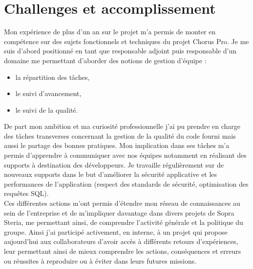 \documentclass[12pt,a4paper]{article}
\begin{document}
\section{Challenges et accomplissement}
Mon expérience de plus d'un an sur le projet m'a permis de monter en compétence sur des sujets fonctionnels et techniques du projet Chorus Pro. Je me suis d'abord positionné en tant que responsable adjoint puis responsable d'un domaine me permettant d'aborder des notions de gestion d'équipe :
\begin{itemize}
\item la répartition des tâches,
\item le suivi d'avancement,
\item le suivi de la qualité.
\end{itemize}
De part mon ambition et ma curiosité professionnelle j'ai pu prendre en charge des tâches transverses concernant la gestion de la qualité du code fourni mais aussi le partage des bonnes pratiques. Mon implication dans ses tâches m'a permis d'apprendre à communiquer avec nos équipes notamment en réalisant des supports à destination des développeurs. Je travaille régulièrement sur de nouveaux supports dans le but d'améliorer la sécurité applicative et les performances de l'application (respect des standards de sécurité, optimisation des requêtes SQL).\\
Ces différentes actions m'ont permis d'étendre mon réseau de connaissances au sein de l'entreprise et de m'impliquer davantage dans divers projets de Sopra Steria, me permettant ainsi, de comprendre l'activité générale et la politique du groupe. Ainsi j'ai participé activement, en interne, à un projet qui propose aujourd'hui aux collaborateurs d'avoir accès à différents retours d'expériences, leur permettant ainsi de mieux comprendre les actions, conséquences et erreurs ou réussites à reproduire ou à éviter dans leurs futures missions.
\newpage
\end{document}
